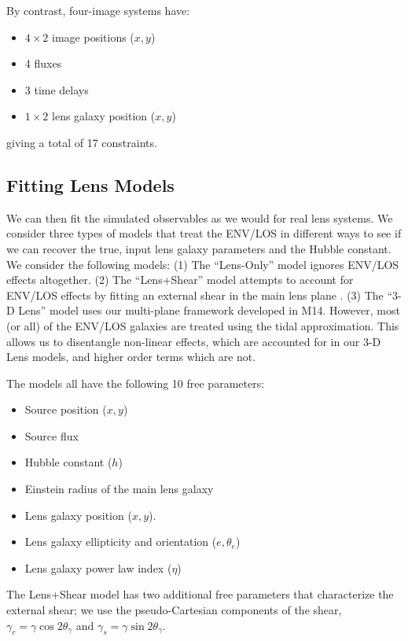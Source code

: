 \documentclass{emulateapj}
\begin{document}
By contrast, four-image systems have:
\begin{itemize}
\item $4\times 2$ image positions ($x,y$)
\item 4 fluxes
\item 3 time delays
\item $1\times 2$ lens galaxy position ($x,y$) 
\end{itemize}
giving a total of 17 constraints.



\subsection{Fitting Lens Models \label{sec:lensmodels}}

We can then fit the simulated observables as we would for real lens systems. We consider three types of models that treat the ENV/LOS in different ways to see if we can recover the true, input lens galaxy parameters and the Hubble constant. We consider the following models:
(1) The ``Lens-Only'' model ignores ENV/LOS effects altogether.
(2) The ``Lens+Shear'' model attempts to account for ENV/LOS effects by fitting an external shear in the main lens plane \citep[e.g.,][]{Suyu13}.
(3) The ``3-D Lens'' model uses our multi-plane framework developed in M14. However, most (or all) of the ENV/LOS galaxies are treated using the tidal approximation. This allows us to disentangle non-linear effects, which are accounted for in our 3-D Lens models, and higher order terms which are not.

The models all have the following 10 free parameters:
\begin{itemize}
\item Source position ($x,y$)
\item Source flux
\item Hubble constant ($h$)
\item Einstein radius of the main lens galaxy
\item Lens galaxy position ($x,y$).
\item Lens galaxy ellipticity and orientation ($e,\theta_e$)
\item Lens galaxy power law index ($\eta$)
\end{itemize}
The Lens+Shear model has two additional free parameters that characterize the external shear; we use the pseudo-Cartesian components of the shear, $\gamma_c = \gamma \cos 2\theta_\gamma$ and $\gamma_s = \gamma \sin 2\theta_\gamma$.
\end{document}
